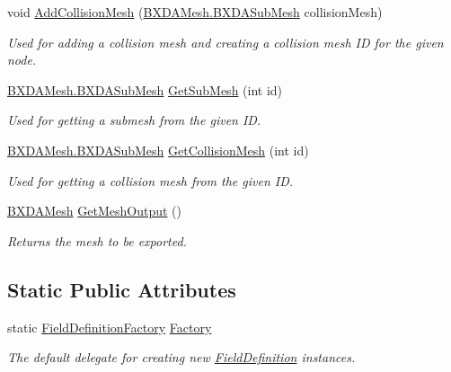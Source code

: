 \begin{DoxyCompactItemize}
void \hyperlink{class_field_definition_a23223a256c66e90bdb4cd80af64ac36a}{Add\+Collision\+Mesh} (\hyperlink{class_b_x_d_a_mesh_1_1_b_x_d_a_sub_mesh}{B\+X\+D\+A\+Mesh.\+B\+X\+D\+A\+Sub\+Mesh} collision\+Mesh)
\begin{DoxyCompactList}\small\item\em Used for adding a collision mesh and creating a collision mesh ID for the given node. \end{DoxyCompactList}\item 
\hyperlink{class_b_x_d_a_mesh_1_1_b_x_d_a_sub_mesh}{B\+X\+D\+A\+Mesh.\+B\+X\+D\+A\+Sub\+Mesh} \hyperlink{class_field_definition_a5d2494daeb5679568c157d8668ca3cd6}{Get\+Sub\+Mesh} (int id)
\begin{DoxyCompactList}\small\item\em Used for getting a submesh from the given ID. \end{DoxyCompactList}\item 
\hyperlink{class_b_x_d_a_mesh_1_1_b_x_d_a_sub_mesh}{B\+X\+D\+A\+Mesh.\+B\+X\+D\+A\+Sub\+Mesh} \hyperlink{class_field_definition_aefa6070137fba9ec6bfb67f3b2639e68}{Get\+Collision\+Mesh} (int id)
\begin{DoxyCompactList}\small\item\em Used for getting a collision mesh from the given ID. \end{DoxyCompactList}\item 
\hyperlink{class_b_x_d_a_mesh}{B\+X\+D\+A\+Mesh} \hyperlink{class_field_definition_a7d7ef7581f135c46488b48c79f3070fe}{Get\+Mesh\+Output} ()
\begin{DoxyCompactList}\small\item\em Returns the mesh to be exported. \end{DoxyCompactList}\end{DoxyCompactItemize}
\subsection*{Static Public Attributes}
\begin{DoxyCompactItemize}
\item 
static \hyperlink{class_field_definition_af50dfa2594c8b9ac6fcc592356c0117a}{Field\+Definition\+Factory} \hyperlink{class_field_definition_a5913096820f688bc8e6642cc8714457d}{Factory}
\begin{DoxyCompactList}\small\item\em The default delegate for creating new \hyperlink{class_field_definition}{Field\+Definition} instances. \end{DoxyCompactList}\end{DoxyCompactItemize}
